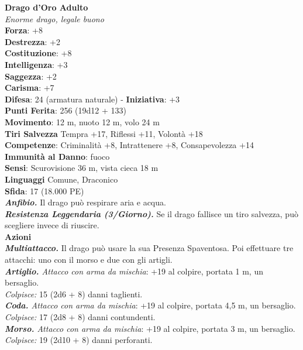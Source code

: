 \begin{multicols}{2}
\medskip\textbf{Drago d'Oro Adulto}\\
\emph{Enorme drago, legale buono}\\
\textbf{Forza}: +8\\
\textbf{Destrezza}: +2\\
\textbf{Costituzione}: +8\\
\textbf{Intelligenza}: +3\\
\textbf{Saggezza}: +2\\
\textbf{Carisma}: +7\\
\textbf{Difesa}: 24 (armatura naturale) - \textbf{Iniziativa}: +3\\
\textbf{Punti Ferita}: 256 (19d12 + 133)\\
\textbf{Movimento}: 12 m, nuoto 12 m, volo 24 m\\
\textbf{Tiri Salvezza} Tempra +17, Riflessi +11, Volontà +18\\
\textbf{Competenze}: Criminalità +8, Intrattenere +8, Consapevolezza +14\\
\textbf{Immunità al Danno}: fuoco\\
\textbf{Sensi}: Scurovisione 36 m, vista cieca 18 m\\
\textbf{Linguaggi} Comune, Draconico\\
\textbf{Sfida}: 17 (18.000 PE)\smallskip\\
\emph{\textbf{Anfibio.}} Il drago può respirare aria e acqua.\\
\emph{\textbf{Resistenza Leggendaria (3/Giorno).}} Se il drago fallisce un tiro salvezza, può scegliere invece di riuscire.\\
\smallskip\textbf{Azioni}\\
\emph{\textbf{Multiattacco.}} Il drago può usare la sua Presenza Spaventosa. Poi effettuare tre attacchi: uno con il morso e due con gli artigli.\\
\emph{\textbf{Artiglio.} Attacco con arma da mischia}: +19 al colpire, portata 1 m, un bersaglio.\\
\emph{Colpisce:} 15 (2d6 + 8) danni taglienti.\\
\emph{\textbf{Coda.} Attacco con arma da mischia}: +19 al colpire, portata 4,5 m, un bersaglio.\\
\emph{Colpisce:} 17 (2d8 + 8) danni contundenti.\\
\emph{\textbf{Morso.} Attacco con arma da mischia}: +19 al colpire, portata 3 m, un bersaglio.\\
\emph{Colpisce:} 19 (2d10 + 8) danni perforanti.\\

\end{multicols}
